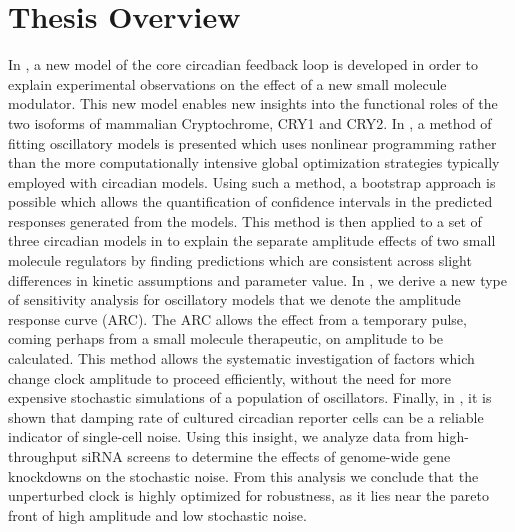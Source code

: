\section{Thesis Overview}
In , a new model of the core circadian feedback loop is developed in order to explain experimental observations on the effect of a new small molecule modulator.
This new model enables new insights into the functional roles of the two isoforms of mammalian Cryptochrome, CRY1 and CRY2.
In , a method of fitting oscillatory models is presented which uses nonlinear programming rather than the more computationally intensive global optimization strategies typically employed with circadian models.
Using such a method, a bootstrap approach is possible which allows the quantification of confidence intervals in the predicted responses generated from the models.
This method is then applied to a set of three circadian models in  to explain the separate amplitude effects of two small molecule regulators by finding predictions which are consistent across slight differences in kinetic assumptions and parameter value.
In , we derive a new type of sensitivity analysis for oscillatory models that we denote the amplitude response curve (ARC).
The ARC allows the effect from a temporary pulse, coming perhaps from a small molecule therapeutic, on amplitude to be calculated.
This method allows the systematic investigation of factors which change clock amplitude to proceed efficiently, without the need for more expensive stochastic simulations of a population of oscillators.
Finally, in , it is shown that damping rate of cultured circadian reporter cells can be a reliable indicator of single-cell noise.
Using this insight, we analyze data from high-throughput siRNA screens to determine the effects of genome-wide gene knockdowns on the stochastic noise.
From this analysis we conclude that the unperturbed clock is highly optimized for robustness, as it lies near the pareto front of high amplitude and low stochastic noise.


